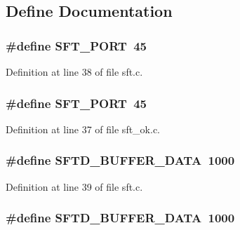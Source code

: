 \subsection{Define Documentation}
\hypertarget{group__tools_gad5edc192bf3e9fd388921b3d378c24a0}{
\subsubsection[{SFT\_\-PORT}]{\setlength{\rightskip}{0pt plus 5cm}\#define SFT\_\-PORT~45}}
\label{group__tools_gad5edc192bf3e9fd388921b3d378c24a0}


Definition at line 38 of file sft.c.

\hypertarget{group__tools_gad5edc192bf3e9fd388921b3d378c24a0}{
\subsubsection[{SFT\_\-PORT}]{\setlength{\rightskip}{0pt plus 5cm}\#define SFT\_\-PORT~45}}
\label{group__tools_gad5edc192bf3e9fd388921b3d378c24a0}


Definition at line 37 of file sft\_\-ok.c.

\hypertarget{group__tools_ga7bbd4dd96f752e1a658cd868530e3fdd}{
\subsubsection[{SFTD\_\-BUFFER\_\-DATA}]{\setlength{\rightskip}{0pt plus 5cm}\#define SFTD\_\-BUFFER\_\-DATA~1000}}
\label{group__tools_ga7bbd4dd96f752e1a658cd868530e3fdd}


Definition at line 39 of file sft.c.

\hypertarget{group__tools_ga7bbd4dd96f752e1a658cd868530e3fdd}{
\subsubsection[{SFTD\_\-BUFFER\_\-DATA}]{\setlength{\rightskip}{0pt plus 5cm}\#define SFTD\_\-BUFFER\_\-DATA~1000}}
\label{group__tools_ga7bbd4dd96f752e1a658cd868530e3fdd}


